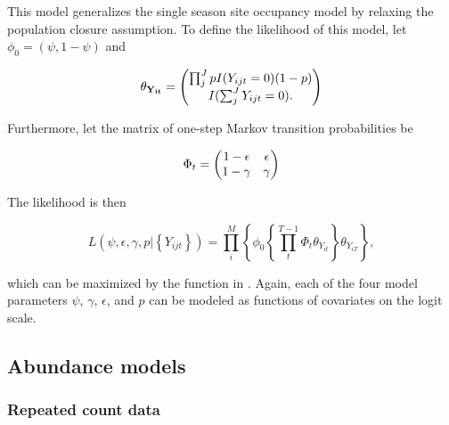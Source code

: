 \documentclass[article,shortnames]{jss}
\newcommand{\um}{\pkg{unmarked}}
\begin{document}
This model generalizes the single season site occupancy model by relaxing the 
population closure assumption. To define the likelihood of this model, 
let $\phi_0 = (\psi, 1-\psi)$ and 

\begin{equation}
  \theta_{{\bf Y_{it}}} =
  \begin{pmatrix}
    \prod_{j}^{J} p I(Y_{ijt}=0)(1-p) \\
    I(\sum_{j}^{J} Y_{ijt}=0). \notag\\
  \end{pmatrix}
\end{equation}

Furthermore, let the matrix of one-step Markov transition probabilities be 

\begin{equation}
  \Phi_t =
  \begin{pmatrix}
    1-\epsilon & \epsilon \\
    1-\gamma & \gamma \notag\\
  \end{pmatrix}
\end{equation}

The likelihood is then

\begin{equation}
L(\psi,\epsilon,\gamma,p | \left\{Y_{ijt}\right\}) = 
 \prod_{i}^{M} \left\{
    \phi_0 \left\{ \prod_{t}^{T-1} \Phi_t \theta_{Y_{it}}  
        \right\} \theta_{Y_{iT}} \right\},
\end{equation}

which can be maximized by the  function in \um. Again, 
each of the four model parameters $\psi$, $\gamma$, 
$\epsilon$, and $p$ can be modeled as functions of covariates on the logit 
scale. 


\subsection{Abundance models}

\subsubsection{Repeated count data}
\label{sec:repeated-count-data}
\end{document}
